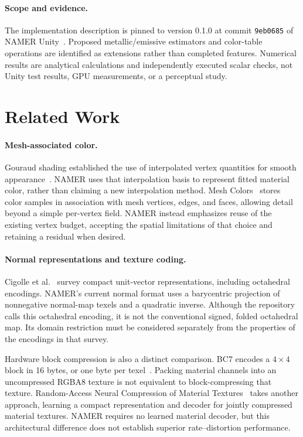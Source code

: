 \documentclass[11pt,letterpaper]{article}
\newcommand{\shortcommit}{9eb0685}
\newcommand{\code}[1]{\texttt{#1}}
\begin{document}
\paragraph{Scope and evidence.}
The implementation description is pinned to version 0.1.0 at commit \code{\shortcommit} of NAMER Unity~\cite{namer2026}. Proposed metallic/emissive estimators and color-table operations are identified as extensions rather than completed features. Numerical results are analytical calculations and independently executed scalar checks, not Unity test results, GPU measurements, or a perceptual study.

\section{Related Work}
\paragraph{Mesh-associated color.}
Gouraud shading established the use of interpolated vertex quantities for smooth appearance~\cite{gouraud1971}. NAMER uses that interpolation basis to represent fitted material color, rather than claiming a new interpolation method. Mesh Colors~\cite{yuksel2010} stores color samples in association with mesh vertices, edges, and faces, allowing detail beyond a simple per-vertex field. NAMER instead emphasizes reuse of the existing vertex budget, accepting the spatial limitations of that choice and retaining a residual when desired.

\paragraph{Normal representations and texture coding.}
Cigolle et al.~\cite{cigolle2014} survey compact unit-vector representations, including octahedral encodings. NAMER's current normal format uses a barycentric projection of nonnegative normal-map texels and a quadratic inverse. Although the repository calls this octahedral encoding, it is not the conventional signed, folded octahedral map. Its domain restriction must be considered separately from the properties of the encodings in that survey.

Hardware block compression is also a distinct comparison. BC7 encodes a $4\times4$ block in 16 bytes, or one byte per texel~\cite{bc7}. Packing material channels into an uncompressed RGBA8 texture is not equivalent to block-compressing that texture. Random-Access Neural Compression of Material Textures~\cite{vaidyanathan2023} takes another approach, learning a compact representation and decoder for jointly compressed material textures. NAMER requires no learned material decoder, but this architectural difference does not establish superior rate--distortion performance.
\end{document}
